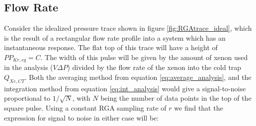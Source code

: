 \documentclass[12pt]{article}
\begin{document}
\subsection{Flow Rate}
Consider the idealized pressure trace shown in figure \ref{fig:RGAtrace_ideal}, which is the result of a rectangular flow rate profile into a system which has an instantaneous response. The flat top of this trace will have a height of $PP_{Kr,eq}=C$.  The width of this pulse will be given by the amount of xenon used in the analysis ($V\Delta P$) divided by the flow rate of the xenon into the cold trap $Q_{Xe,CT}$. Both the averaging method from equation \ref{eq:average_analysis}, and the integration method from equation \ref{eq:int_analysis} would give a signal-to-noise proportional to $1/\sqrt{N}$, with $N$ being the number of data points in the top of the square pulse. Using a constant RGA sampling rate of $r$ we find that the expression for signal to noise in either case will be:
\end{document}
